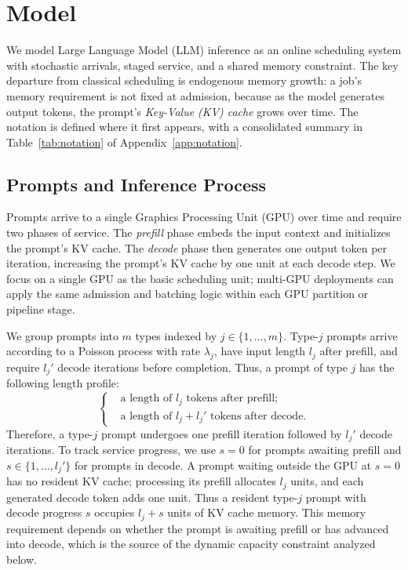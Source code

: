 \section{Model}
\label{sec:model}

We model Large Language Model (LLM) inference as an online scheduling system with stochastic arrivals, staged service, and a shared memory constraint. The key departure from classical scheduling is endogenous memory growth: a job's memory requirement is not fixed at admission, because as the model generates output tokens, the prompt's \textit{Key-Value (KV) cache} grows over time. The notation is defined where it first appears, with a consolidated summary in Table~\ref{tab:notation} of Appendix~\ref{app:notation}.

\subsection{Prompts and Inference Process}

Prompts arrive to a single Graphics Processing Unit (GPU) over time and require two phases of service. The \textit{prefill} phase embeds the input context and initializes the prompt's KV cache. The \textit{decode} phase then generates one output token per iteration, increasing the prompt's KV cache by one unit at each decode step. We focus on a single GPU as the basic scheduling unit; multi-GPU deployments can apply the same admission and batching logic within each GPU partition or pipeline stage.




We group prompts into \( m \) types indexed by \( j \in \{1, \dots, m\} \). Type-\(j\) prompts arrive according to a Poisson process with rate \( \lambda_j \), have input length \(l_j\) after prefill, and require \(l_j'\) decode iterations before completion.
Thus, a prompt of type \( j \) has the following length profile:
\begin{equation*}
    \left\{
    \begin{aligned}
        &\text{a length of } l_j \text{ tokens after prefill;}\\
        &\text{a length of } l_j + l_j' \text{ tokens after decode.}
    \end{aligned}
    \right.
\end{equation*}
Therefore, a type-$j$ prompt undergoes one prefill iteration followed by \(l_j'\) decode iterations. To track service progress, we use \(s=0\) for prompts awaiting prefill and \(s \in \{1, \dots, l_j'\}\) for prompts in decode. A prompt waiting outside the GPU at \(s=0\) has no resident KV cache; processing its prefill allocates \(l_j\) units, and each generated decode token adds one unit. Thus a resident type-$j$ prompt with decode progress \(s\) occupies \(l_j+s\) units of KV cache memory. This memory requirement depends on whether the prompt is awaiting prefill or has advanced into decode, which is the source of the dynamic capacity constraint analyzed below.

